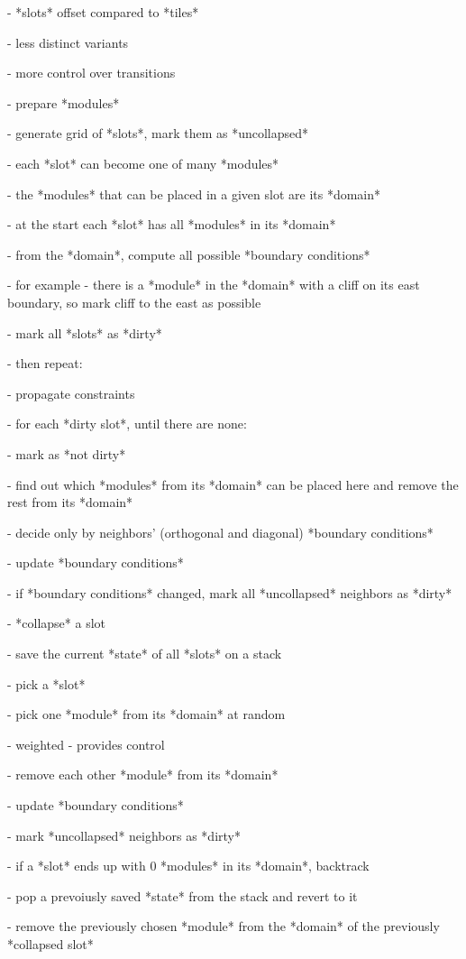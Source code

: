 - *slots* offset compared to *tiles*

- less distinct variants

- more control over transitions

- prepare *modules*

- generate grid of *slots*, mark them as *uncollapsed*

- each *slot* can become one of many *modules*

- the *modules* that can be placed in a given slot are its *domain*

- at the start each *slot* has all *modules* in its *domain*

- from the *domain*, compute all possible *boundary conditions*

- for example - there is a *module* in the *domain* with a cliff on its east boundary, so mark cliff to the east as possible

- mark all *slots* as *dirty*

- then repeat:

- propagate constraints

- for each *dirty slot*, until there are none:

- mark as *not dirty*

- find out which *modules* from its *domain* can be placed here and remove the rest from its *domain*

- decide only by neighbors' (orthogonal and diagonal) *boundary conditions*

- update *boundary conditions*

- if *boundary conditions* changed, mark all *uncollapsed* neighbors as *dirty*

- *collapse* a slot

- save the current *state* of all *slots* on a stack

- pick a *slot*

- pick one *module* from its *domain* at random

- weighted - provides control

- remove each other *module* from its *domain*

- update *boundary conditions*

- mark *uncollapsed* neighbors as *dirty*

- if a *slot* ends up with 0 *modules* in its *domain*, backtrack

- pop a prevoiusly saved *state* from the stack and revert to it

- remove the previously chosen *module* from the *domain* of the previously *collapsed slot*


